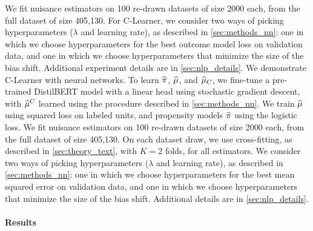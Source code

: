     We fit nuisance estimators on 100 re-drawn datasets of size 2000 each, from the full dataset of size 405,130. 
    For C-Learner, we consider two ways of picking hyperparameters ($\lambda$ and learning rate), as described in \cref{sec:methods_nn}: one in which we choose hyperparameters for the best outcome model loss on validation data, and one in which we choose hyperparameters that minimize the size of the bias shift. 
    Additional experiment details are in \cref{sec:nlp_details}. 
\else
    We demonstrate C-Learner with neural networks. To learn $\widehat{\pi}$, $\widehat{\mu}$, and $\widehat{\mu}_C$, we fine-tune a pre-trained DistilBERT model \citep{distilbert} with a linear head using stochastic gradient descent, with $\widehat{\mu}^C$ learned using the procedure described in \cref{sec:methods_nn}. 
    We train $\widehat{\mu}$
    using squared loss on labeled units, and propensity models $\widehat{\pi}$ using the logistic loss. 
    We fit nuisance estimators on 100 re-drawn datasets of size 2000 each, from the full dataset of size 405,130. On each dataset draw, we use cross-fitting, as described in \cref{sec:theory_text}, with $K=2$ folds, for all estimators. We consider two ways of picking hyperparameters ($\lambda$ and learning rate), as described in \cref{sec:methods_nn}: one in which we choose hyperparameters for the best mean squared error on validation data, and one in which we choose hyperparameters that minimize the size of the bias shift. 
    Additional  details are in \cref{sec:nlp_details}. 
\fi




\paragraph{Results}


